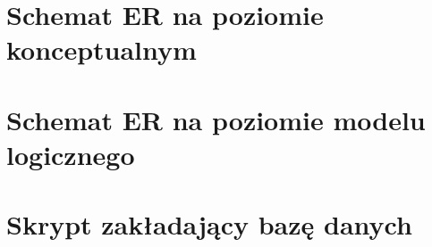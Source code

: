\documentclass{mwrep}
\begin{document}
\appendix
\chapter{Schemat ER na poziomie konceptualnym}

\chapter{Schemat ER na poziomie modelu logicznego}

\chapter{Skrypt zakładający bazę danych}

\clearpage
{}
	
\end{document}
